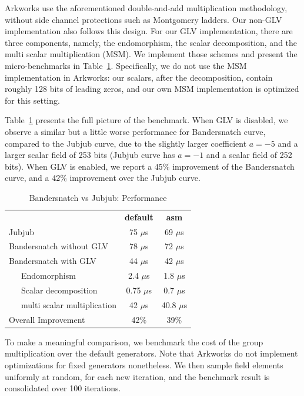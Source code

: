 \documentclass[smallextended]{svjour3}
\begin{document}
Arkworks use the aforementioned double-and-add
multiplication methodology, without side channel protections such 
as Montgomery ladders. Our non-GLV implementation also follows
this design. For our GLV implementation, there are three components,
namely, the endomorphism, the scalar decomposition, and the
multi scalar multiplication (MSM). We implement those schemes and 
present the micro-benchmarks in Table~\ref{tab:comp_full}.
Specifically, we do not use the MSM implementation in Arkworks:
our scalars, after the decomposition, contain roughly 128 bits
of leading zeros, and our own MSM implementation is 
optimized for this setting.

Table~\ref{tab:comp_full} presents the full picture of the benchmark.
When GLV is disabled, we observe a similar but a little worse 
performance for Bandersnatch curve, compared to
the Jubjub curve, due to the slightly larger coefficient 
$a=-5$ and a larger scalar field of 253 bits (Jubjub curve has $a=-1$
and a scalar field of 252 bits).
When GLV is enabled, we report a 45\% improvement of the Bandersnatch
curve, and a 42\% improvement over the Jubjub curve.



\begin{table}[!ht]
  \centering%
  \begin{tabularx}{\textwidth}{lcc}
      & \textbf{default} & \textbf{asm}\\
    Jubjub & 75 $\mu$s & 69 $\mu$s \\
    Bandersnatch without GLV & 78 $\mu$s & 72 $\mu$s  \\   
    Bandersnatch with GLV& 44 $\mu$s & 42 $\mu$s \\
    \ \ \ Endomorphism & 2.4 $\mu$s& 1.8 $\mu$s\\
    \ \ \ Scalar decomposition & 0.75 $\mu$s & 0.7 $\mu$s \\
    \ \ \ multi scalar multiplication & 42 $\mu$s &  40.8 $\mu$s\\
    Overall Improvement & 42\% & 39\% \\
  \end{tabularx}
  \caption{Bandersnatch vs Jubjub: Performance}
  \label{tab:comp_full}
\end{table}

To make a meaningful comparison, we benchmark
the cost of the group multiplication over the default generators.
Note that Arkworks do not implement optimizations for 
fixed generators nonetheless. We then sample field elements 
uniformly at random, for each new iteration, and the benchmark
result is consolidated over 100 iterations.
\end{document}
